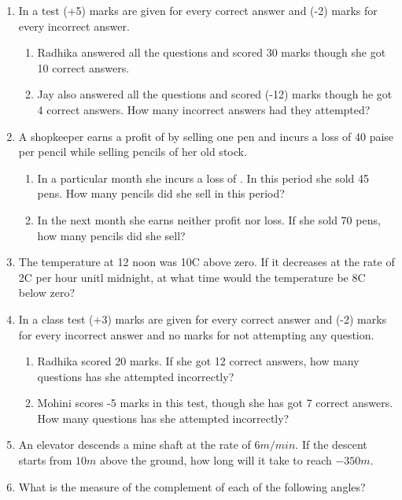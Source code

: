 \begin{enumerate}[label=\thesubsection.\arabic*, ref=\thesubsection.\theenumi,resume*]
	\item In a test (+5) marks are given for every correct answer and (-2) marks for every incorrect answer.  
		\begin{enumerate}
			\item Radhika answered all the questions and scored 30 marks though she got 10 correct answers.
			\item Jay also answered all the questions and scored (-12) marks though he got 4 correct answers.  How many incorrect answers had they  attempted?
		\end{enumerate}
	\item A shopkeeper earns a profit of  by selling one pen and incurs a loss of 40 paise per pencil while selling pencils of her old stock.  
		\begin{enumerate}
			\item In a particular month she incurs a loss of .  In this period she sold 45 pens.  How many pencils did she sell in this period?
			\item In the next month she earns neither profit nor loss.  If she sold 70 pens, how many pencils did she sell?
		\end{enumerate}
			\item The temperature at 12 noon was 10\degree C above zero. If it decreases at the rate of 2\degree C per hour unitl midnight, at what time would the temperature be 8\degree C below zero? 
	\item In a class test (+3) marks are given for every correct answer and (-2) marks for every incorrect answer and no marks for not attempting any question.   
		\begin{enumerate}
			\item Radhika scored 20 marks.  If she got 12 correct answers, how many questions has she attempted incorrectly?
			\item Mohini scores -5 marks in this test, though she has got 7 correct answers.   How many questions has she attempted incorrectly?
		\end{enumerate}
	\item An elevator descends a mine shaft at the rate of $6m/min$.  If the descent starts from $10m$ above the ground, how long will it take to reach $-350m$.
	\item What is the measure of the complement of each of the following angles? 
		\begin{enumerate}

\end{enumerate}
\end{enumerate}
